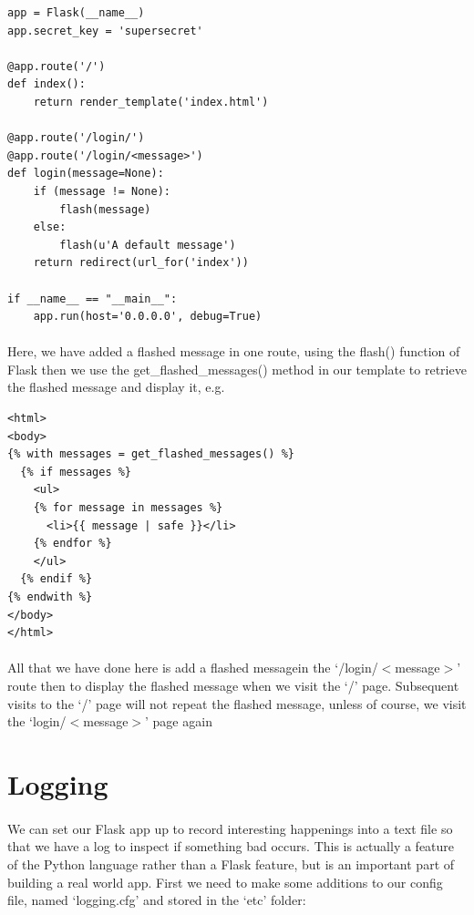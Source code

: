 \documentclass[12pt, a4paper, oneside]{book}
\begin{document}
{\begin{lstlisting}
app = Flask(__name__)
app.secret_key = 'supersecret'

@app.route('/')
def index():
    return render_template('index.html')

@app.route('/login/')
@app.route('/login/<message>')
def login(message=None):
    if (message != None):
        flash(message)
    else:
        flash(u'A default message')
    return redirect(url_for('index'))

if __name__ == "__main__":
    app.run(host='0.0.0.0', debug=True)
\end{lstlisting}
\paragraph{} Here, we have added a flashed message in one route, using the flash() function of Flask then we use the get\_flashed\_messages() method in our template to retrieve the flashed message and display it, e.g.

\begin{lstlisting}
<html>
<body>
{% with messages = get_flashed_messages() %}
  {% if messages %}
    <ul>
    {% for message in messages %}
      <li>{{ message | safe }}</li>
    {% endfor %}
    </ul>
  {% endif %}
{% endwith %}
</body>
</html>
\end{lstlisting}

\paragraph{} All that we have done here is add a flashed messagein the `/login/$<$message$>$' route then to display the flashed message when we visit the `/' page. Subsequent visits to the `/' page will not repeat the flashed message, unless of course, we visit the `login/$<$message$>$' page again

\section{Logging}
\label{logging}
\paragraph{} We can set our Flask app up to record interesting happenings into a text file so that we have a log to inspect if something bad occurs. This is actually a feature of the Python language rather than a Flask feature, but is an important part of building a real world app. First we need to make some additions to our config file, named `logging.cfg' and stored in the  `etc' folder:

}
\end{document}
